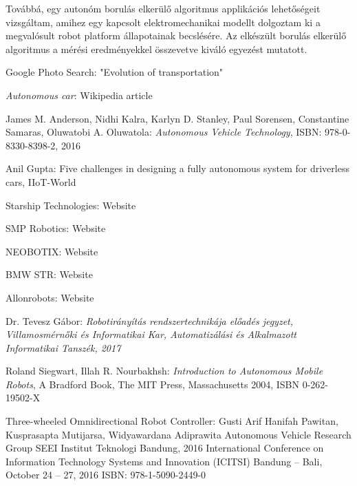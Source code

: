 \documentclass[12pt,english,twoside]{article}
\begin{document}
Továbbá, egy autonóm borulás elkerülő algoritmus applikációs lehetőségeit vizsgáltam, amihez egy kapcsolt elektromechanikai modellt dolgoztam ki a megvalósult robot platform állapotainak becslésére. Az elkészült borulás elkerülő algoritmus a mérési 
eredményekkel összevetve kiváló egyezést mutatott.


\newpage
\newpage
\begin{thebibliography}{1}
	
	
	 Google Photo Search: "Evolution of transportation"
	
	\emph{Autonomous car}: Wikipedia article
	
	James M. Anderson, Nidhi Kalra, Karlyn D. Stanley, Paul Sorensen, Constantine Samaras, Oluwatobi A. Oluwatola: \emph{Autonomous Vehicle Technology}, ISBN: 978-0-8330-8398-2, 2016
	
	Anil Gupta: Five challenges in designing a fully autonomous system for driverless cars, IIoT-World
	
	Starship Technologies: Website
	
	SMP Robotics: Website
	
	NEOBOTIX: Website
	
	BMW STR: Website
	
	 Allonrobots: Website
	
	Dr. Tevesz Gábor:
	\emph{Robotirányítás rendszertechnikája előadés jegyzet, Villamosmérnőki és Informatikai Kar, Automatizálási és Alkalmazott Informatikai Tanszék, 2017}
	
	Roland Siegwart, Illah R. Nourbakhsh:
	\emph{Introduction to Autonomous Mobile Robots}, A Bradford Book, The MIT Press, Massachusetts 2004,
	ISBN 0-262-19502-X
	
	 Three-wheeled Omnidirectional Robot Controller: Gusti Arif Hanifah Pawitan, Kusprasapta Mutijarsa, Widyawardana Adiprawita
	Autonomous Vehicle Research Group SEEI Institut Teknologi Bandung, 2016 International Conference on Information Technology Systems and Innovation (ICITSI)
	Bandung – Bali, October 24 – 27, 2016 ISBN: 978-1-5090-2449-0
	

\end{thebibliography}
\end{document}
